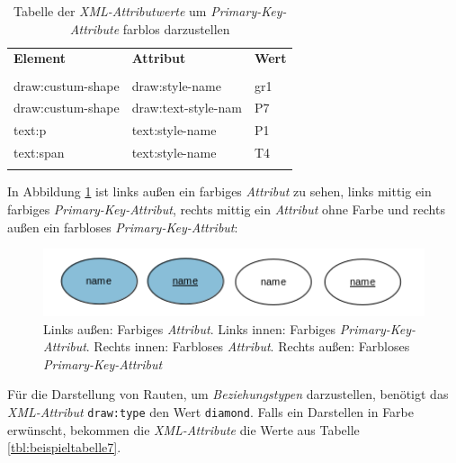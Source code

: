 \begin{table}[H]
	\centering
	\begin{tabular}{lll}
		\textbf{Element} & \textbf{Attribut}  & \textbf{Wert} \\
		\\
		draw:custum-shape & draw:style-name           & gr1             \\
		draw:custum-shape & draw:text-style-nam      & P7            \\
		text:p & text:style-name       & P1             \\
		text:span & text:style-name       & T4             \\
		\\
	\end{tabular}
	
	\caption{Tabelle der \textit{XML-Attributwerte} um \textit{Primary-Key-Attribute} farblos darzustellen}
	\label{tbl:beispieltabelle6}
	
\end{table}
\hon{}
\noindent
In Abbildung \ref{ergebnis8} ist links außen ein farbiges \textit{Attribut} zu sehen, links mittig ein farbiges \textit{Primary-Key-Attribut}, rechts mittig ein \textit{Attribut} ohne Farbe und rechts außen ein farbloses \textit{Primary-Key-Attribut}:
\begin{figure}[H]
	\centering
	\includegraphics[width=12cm]{images/15.png}
	\caption{Links außen: Farbiges \textit{Attribut}. Links innen: Farbiges \textit{Primary-Key-Attribut}. Rechts innen: Farbloses \textit{Attribut}. Rechts außen: Farbloses \textit{Primary-Key-Attribut}}
	\label{ergebnis8}
\end{figure}
\hon{}
\noindent
Für die Darstellung von Rauten, um \textit{Beziehungstypen} darzustellen, benötigt das \textit{XML-Attribut} \verb|draw:type| den Wert \verb|diamond|. 
Falls ein Darstellen in Farbe erwünscht, bekommen die \textit{XML-Attribute} die Werte aus Tabelle \ref{tbl:beispieltabelle7}.


